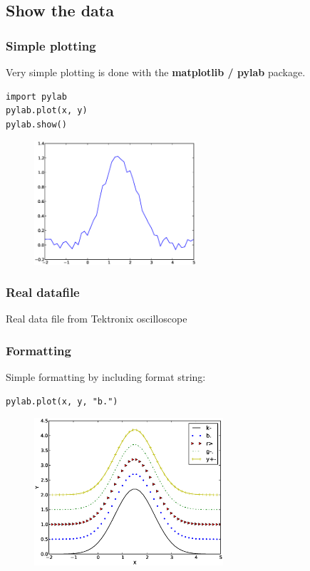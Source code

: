 \documentclass{beamer}
\begin{document}
\subsection{Show the data}
\begin{frame}[fragile]
	\frametitle{Simple plotting}
Very simple plotting is done with the \textbf{matplotlib / pylab} package.
\begin{lstlisting}
import pylab
pylab.plot(x, y)
pylab.show()
\end{lstlisting}
\begin{figure}[htp]
\centering
\includegraphics[width=6cm]{code/example02}
\end{figure}
\end{frame}


\begin{frame}[fragile]
	\frametitle{Real datafile}
Real data file from Tektronix oscilloscope
\end{frame}


\begin{frame}[fragile]
	\frametitle{Formatting}
Simple formatting by including format string:
\begin{lstlisting}
pylab.plot(x, y, "b.")
\end{lstlisting}
\begin{figure}[htp]
\centering
\includegraphics[width=7cm]{code/formatting}
\end{figure}
\end{frame}
\end{document}
